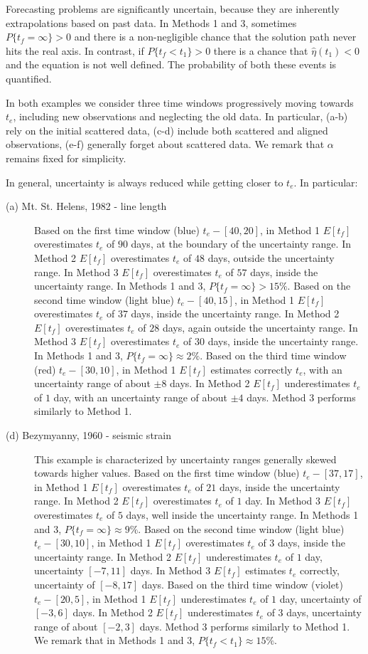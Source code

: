 \documentclass{article}
\begin{document}
Forecasting problems are significantly uncertain, because they are inherently extrapolations based on past data. In Methods 1 and 3, sometimes $P\{t_f=\infty\} >0$ and there is a non-negligible chance that the solution path never hits the real axis. In contrast, if $P\{t_f<t_1\} >0$ there is a chance that $\hat\eta(t_1)<0$ and the equation is not well defined. The probability of both these events is quantified.

In both examples we consider three time windows progressively moving towards $t_e$, including new observations and neglecting the old data. In particular, (a-b) rely on the initial scattered data, (c-d) include both scattered and aligned observations, (e-f) generally forget about scattered data. We remark that $\alpha$ remains fixed for simplicity.

In general, uncertainty is always reduced while getting closer to $t_e$. In particular:
\begin{description}
  \item[(a) Mt. St. Helens, 1982 - line length] Based on the first time window (blue) $t_e-[40,20]$, in Method 1 $E[t_f]$ overestimates $t_e$ of $90$ days, at the boundary of the uncertainty range. In Method 2 $E[t_f]$ overestimates $t_e$ of $48$ days, outside the uncertainty range. In Method 3 $E[t_f]$ overestimates $t_e$ of $57$ days, inside the uncertainty range. In Methods 1 and 3, $P\{t_f=\infty\} > 15\%$. Based on the second time window (light blue) $t_e-[40,15]$, in Method 1 $E[t_f]$ overestimates $t_e$ of $37$ days, inside the uncertainty range. In Method 2 $E[t_f]$ overestimates $t_e$ of $28$ days, again outside the uncertainty range. In Method 3 $E[t_f]$ overestimates $t_e$ of $30$ days, inside the uncertainty range. In Methods 1 and 3, $P\{t_f=\infty\} \approx 2\%$. Based on the third time window (red) $t_e-[30,10]$, in Method 1 $E[t_f]$ estimates correctly $t_e$, with an uncertainty range of about $\pm 8$ days. In Method 2 $E[t_f]$ underestimates $t_e$ of $1$ day, with an uncertainty range of about $\pm 4$ days. Method 3 performs similarly to Method 1.
  \item[(d) Bezymyanny, 1960 - seismic strain] This example is characterized by uncertainty ranges generally skewed towards higher values. Based on the first time window (blue) $t_e-[37,17]$, in Method 1 $E[t_f]$ overestimates $t_e$ of $21$ days, inside the uncertainty range. In Method 2 $E[t_f]$ overestimates $t_e$ of $1$ day. In Method 3 $E[t_f]$ overestimates $t_e$ of $5$ days, well inside the uncertainty range. In Methods 1 and 3, $P\{t_f=\infty\} \approx 9\%$. Based on the second time window (light blue) $t_e-[30,10]$, in Method 1 $E[t_f]$ overestimates $t_e$ of $3$ days, inside the uncertainty range. In Method 2 $E[t_f]$ underestimates $t_e$ of $1$ day, uncertainty $[-7,11]$ days. In Method 3 $E[t_f]$ estimates $t_e$ correctly, uncertainty of $[-8,17]$ days. Based on the third time window (violet) $t_e-[20,5]$, in Method 1 $E[t_f]$ underestimates $t_e$ of $1$ day, uncertainty of $[-3,6]$ days. In Method 2 $E[t_f]$ underestimates $t_e$ of $3$ days, uncertainty range of about $[-2,3]$ days. Method 3 performs similarly to Method 1. We remark that in Methods 1 and 3, $P\{t_f<t_1\} \approx 15\%$.
\end{description}
\end{document}
